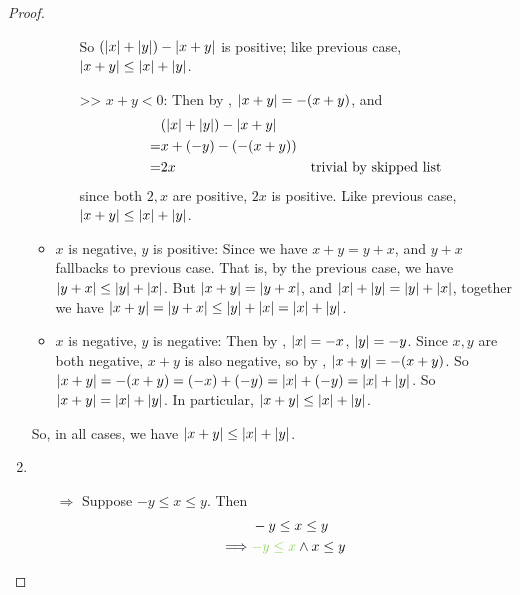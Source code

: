 \begin{proof}
\begin{enumerate}
\begin{itemize}
\begin{itemize}
                        So \((\lvert x\rvert + \lvert y\rvert) - \lvert x + y\rvert\) is positive; like previous case, \(\lvert x + y\rvert \le \lvert x\rvert + \lvert y\rvert\).
                    \item[>>] \(x + y < 0\):
                        Then by , \(\lvert x + y\rvert = -(x + y)\), and
                        \begin{align*}
                               & (\lvert x\rvert + \lvert y\rvert) - \lvert x + y\rvert \\
                             = & x + (-y) - (-(x + y)) \\
                             = & 2 x & \text{trivial by skipped list} \\
                        \end{align*}
                        since both \(2, x\) are positive, \(2x\) is positive.
                        Like previous case, \(\lvert x + y\rvert \le \lvert x\rvert + \lvert y\rvert\).
                \end{itemize}
            \item \(x\) is negative, \(y\) is positive:
                Since we have \(x + y = y + x\), and \(y + x\) fallbacks to previous case.
                That is, by the previous case, we have \(\lvert y + x\rvert \le \lvert y\rvert + \lvert x\rvert\).
                But \(\lvert x + y\rvert = \lvert y + x\rvert\), and \(\lvert x\rvert + \lvert y\rvert = \lvert y\rvert + \lvert x\rvert\), together we have \(\lvert x + y\rvert = \lvert y + x\rvert \le \lvert y\rvert + \lvert x\rvert = \lvert x\rvert + \lvert y\rvert\).
            \item \(x\) is negative, \(y\) is negative:
                Then by , \(\lvert x\rvert = -x\), \(\lvert y\rvert = -y\).
                Since \(x, y\) are both negative, \(x + y\) is also negative, so by , \(\lvert x + y\rvert = -(x + y)\).
                So \(\lvert x + y\rvert = -(x + y) = (-x) + (-y) = \lvert x\rvert + (-y) = \lvert x\rvert + \lvert y\rvert\).
                So \(\lvert x + y\rvert = \lvert x\rvert + \lvert y\rvert\).
                In particular, \(\lvert x + y\rvert \le \lvert x\rvert + \lvert y\rvert\).
        \end{itemize}
        So, in all cases, we have \(\lvert x + y\rvert \le \lvert x\rvert + \lvert y\rvert\).
    \item
        \begin{itemize}
            \item[\(\Longrightarrow\)] Suppose \(-y \le x \le y\). Then
                \begin{align*}
                             & -y \le x \le y \\
                    \implies & \GREEN{-y \le x} \land x \le y \\

\end{align*}
\end{itemize}
\end{enumerate}
\end{proof}
